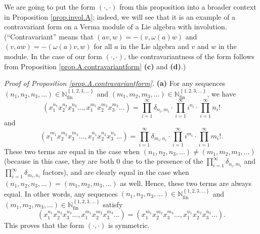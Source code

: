 \documentclass[etingof-lie.tex]{subfiles}
\begin{document}
We are going to put the form $\left(  \cdot,\cdot\right)  $ from this
proposition into a broader context in Proposition \ref{prop.invol.A}; indeed,
we will see that it is an example of a contravariant form on a Verma module of
a Lie algebra with involution. (``Contravariant'' means that $\left(
av,w\right)  =-\left(  v,\omega\left(  a\right)  w\right)  $ and $\left(
v,aw\right)  =-\left(  \omega\left(  a\right)  v,w\right)  $ for all $a$ in
the Lie algebra and $v$ and $w$ in the module. In the case of our form
$\left(  \cdot,\cdot\right)  $, the contravariantness of the form follows from
Proposition \ref{prop.A.contravariantform} \textbf{(c)} and \textbf{(d)}.)

\textit{Proof of Proposition \ref{prop.A.contravariantform}.} \textbf{(a)} For
any sequences $\left(  n_{1},n_{2},n_{3},...\right)  \in\mathbb{N}%
_{\operatorname*{fin}}^{\left\{  1,2,3,...\right\}  }$ and $\left(
m_{1},m_{2},m_{3},...\right)  \in\mathbb{N}_{\operatorname*{fin}}^{\left\{
1,2,3,...\right\}  }$, we have%
\[
\left(  x_{1}^{n_{1}}x_{2}^{n_{2}}x_{3}^{n_{3}}...,x_{1}^{m_{1}}x_{2}^{m_{2}%
}x_{3}^{m_{3}}...\right)  =\prod\limits_{i=1}^{\infty}\delta_{n_{i},m_{i}%
}\cdot\prod\limits_{i=1}^{\infty}i^{n_{i}}\cdot\prod\limits_{i=1}^{\infty
}n_{i}!
\]
and%
\[
\left(  x_{1}^{m_{1}}x_{2}^{m_{2}}x_{3}^{m_{3}}...,x_{1}^{n_{1}}x_{2}^{n_{2}%
}x_{3}^{n_{3}}...\right)  =\prod\limits_{i=1}^{\infty}\delta_{m_{i},n_{i}%
}\cdot\prod\limits_{i=1}^{\infty}i^{m_{i}}\cdot\prod\limits_{i=1}^{\infty
}m_{i}!.
\]
These two terms are equal in the case when $\left(  n_{1},n_{2},n_{3}%
,...\right)  \neq\left(  m_{1},m_{2},m_{3},...\right)  $ (because in this
case, they are both $0$ due to the presence of the $\prod\limits_{i=1}%
^{\infty}\delta_{n_{i},m_{i}}$ and $\prod\limits_{i=1}^{\infty}\delta
_{m_{i},n_{i}}$ factors), and are clearly equal in the case when $\left(
n_{1},n_{2},n_{3},...\right)  =\left(  m_{1},m_{2},m_{3},...\right)  $ as
well. Hence, these two terms are always equal. In other words, any sequences
$\left(  n_{1},n_{2},n_{3},...\right)  \in\mathbb{N}_{\operatorname*{fin}%
}^{\left\{  1,2,3,...\right\}  }$ and $\left(  m_{1},m_{2},m_{3},...\right)
\in\mathbb{N}_{\operatorname*{fin}}^{\left\{  1,2,3,...\right\}  }$ satisfy
\[
\left(  x_{1}^{n_{1}}x_{2}^{n_{2}}x_{3}^{n_{3}}...,x_{1}^{m_{1}}x_{2}^{m_{2}%
}x_{3}^{m_{3}}...\right)  =\left(  x_{1}^{m_{1}}x_{2}^{m_{2}}x_{3}^{m_{3}%
}...,x_{1}^{n_{1}}x_{2}^{n_{2}}x_{3}^{n_{3}}...\right)  .
\]
This proves that the form $\left(  \cdot,\cdot\right)  $ is symmetric.
\end{document}
